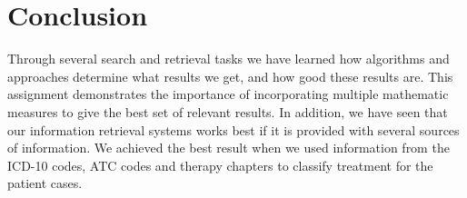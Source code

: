 \chapter{Conclusion}
\label{cha:conclusion}
Through several search and retrieval tasks we have learned how algorithms and approaches determine what results we get, and how good these results are. This assignment demonstrates the importance of incorporating multiple mathematic measures to give the best set of relevant results. In addition, we have seen that our information retrieval systems works best if it is provided with several sources of information. We achieved the best result when we used information from the ICD-10 codes, ATC codes and therapy chapters to classify treatment for the patient cases. 
                                
                             